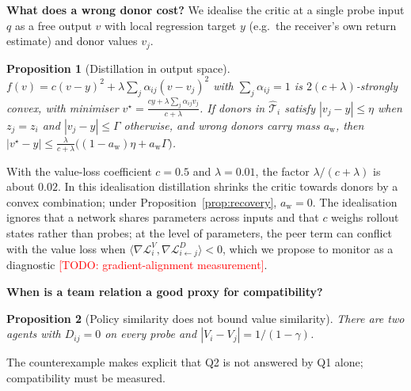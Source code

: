 \documentclass{article}
\newtheorem{proposition}{Proposition}
\theoremstyle{remark}
\newcommand{\todo}[1]{\textcolor{red}{[TODO: #1]}}
\begin{document}
\textbf{What does a wrong donor cost?} We idealise the critic at a single probe input $q$ as a free output $v$ with local
regression target $y$ (e.g.\ the receiver's own return estimate) and donor values $v_j$.
\begin{proposition}[Distillation in output space]
\label{prop:bias}
$f(v)=c(v-y)^2+\lambda\sum_j\alpha_{ij}(v-v_j)^2$ with $\sum_j\alpha_{ij}=1$ is $2(c+\lambda)$-strongly convex, with minimiser
$v^\star=\frac{cy+\lambda\sum_j\alpha_{ij}v_j}{c+\lambda}$. If donors in $\hat{\mathcal{T}}_i$ satisfy $|v_j-y|\le\eta$ when
$z_j=z_i$ and $|v_j-y|\le\Gamma$ otherwise, and wrong donors carry mass $a_{\mathrm{w}}$, then
$|v^\star-y|\le\frac{\lambda}{c+\lambda}\big((1-a_{\mathrm{w}})\eta+a_{\mathrm{w}}\Gamma\big)$.
\end{proposition}
With the value-loss coefficient $c=0.5$ and $\lambda=0.01$, the factor $\lambda/(c+\lambda)$ is about $0.02$. In this idealisation
distillation shrinks the critic towards donors by a convex combination; under Proposition~\ref{prop:recovery}, $a_{\mathrm{w}}=0$. The
idealisation ignores that a network shares parameters across inputs and that $c$ weighs rollout states rather than probes; at the
level of parameters, the peer term can conflict with the value loss when
$\langle\nabla\mathcal{L}^V_i,\nabla\mathcal{L}^D_{i\leftarrow j}\rangle<0$, which we propose to monitor as a diagnostic
\todo{gradient-alignment measurement}.

\textbf{When is a team relation a good proxy for compatibility?}
\begin{proposition}[Policy similarity does not bound value similarity]
\label{prop:counter}
There are two agents with $D_{ij}=0$ on every probe and $|V_i-V_j|=1/(1-\gamma)$.
\end{proposition}
The counterexample makes explicit that Q2 is not answered by Q1 alone; compatibility must be measured.
\end{document}
